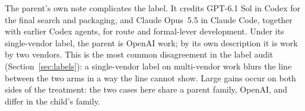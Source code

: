 The parent's own note complicates the label.
It credits GPT-6.1 Sol in Codex for the final search and packaging, and Claude Opus~5.5 in Claude Code, together with earlier Codex agents, for route and formal-lever development.
Under its single-vendor label, the parent is OpenAI work; by its own description it is work by two vendors.
This is the most common disagreement in the label audit (Section~\ref{sec:labels}): a single-vendor label on multi-vendor work blurs the line between the two arms in a way the  line cannot show.
Large gains occur on both sides of the treatment: the two cases here share a parent family, OpenAI, and differ in the child's family.
